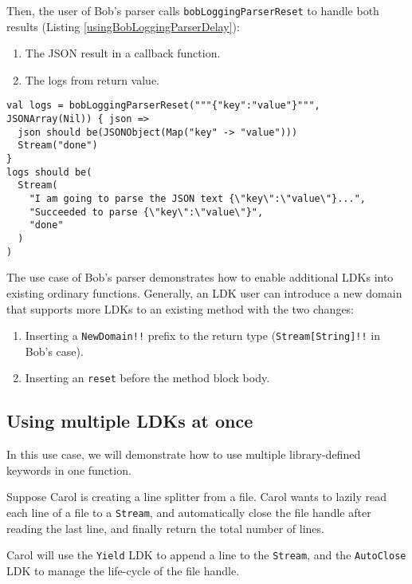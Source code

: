 Then, the user of Bob's parser calls \lstinline{bobLoggingParserReset} to handle both results (Listing \ref{usingBobLoggingParserDelay}):

\begin{enumerate}
  \item The JSON result in a callback function.
  \item The logs from return value.
\end{enumerate}

\begin{lstlisting}[caption={Using Bob's parser},label={usingBobLoggingParserDelay}]
val logs = bobLoggingParserReset("""{"key":"value"}""", JSONArray(Nil)) { json =>
  json should be(JSONObject(Map("key" -> "value")))
  Stream("done")
}
logs should be(
  Stream(
    "I am going to parse the JSON text {\"key\":\"value\"}...",
    "Succeeded to parse {\"key\":\"value\"}",
    "done"
  )
)
\end{lstlisting}

The use case of Bob's parser demonstrates how to enable additional LDKs into existing ordinary functions. Generally, an LDK user can introduce a new domain that supports more LDKs to an existing method with the two changes:

\begin{enumerate}
  \item Inserting a \lstinline{NewDomain!!} prefix to the return type (\lstinline{Stream[String]!!} in Bob's case).
  \item Inserting an \lstinline{reset} before the method block body.
\end{enumerate}

\subsection{Using multiple LDKs at once}\label{Using multiple LDKs at once}

In this use case, we will demonstrate how to use multiple library-defined keywords in one function.

Suppose Carol is creating a line splitter from a file. Carol wants to lazily read each line of a file to a \lstinline{Stream}, and automatically close the file handle after reading the last line, and finally return the total number of lines.

Carol will use the \lstinline{Yield} LDK to append a line to the \lstinline{Stream}, and the \lstinline{AutoClose} LDK to manage the life-cycle of the file handle.

